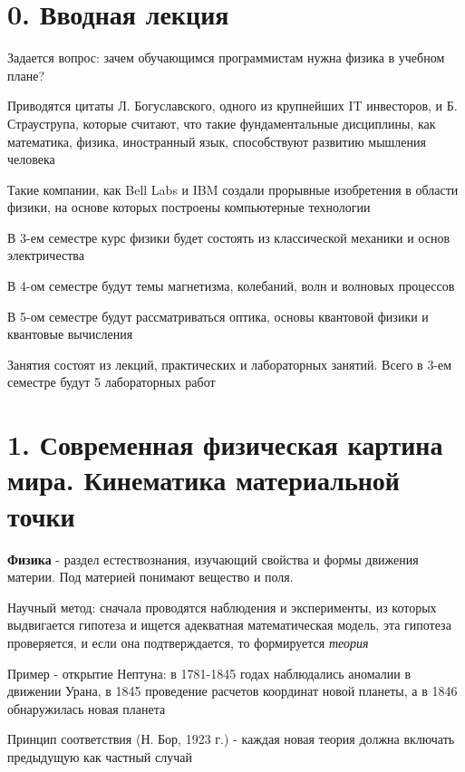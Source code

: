 \documentclass[12pt]{article}
\begin{document}
    \tableofcontents
    \clearpage


    \section{0. Вводная лекция}

    Задается вопрос: зачем обучающимся программистам нужна физика в учебном плане?

    Приводятся цитаты Л. Богуславского, одного из крупнейших IT инвесторов, и Б. Страуструпа, которые считают,
    что такие фундаментальные дисциплины, как математика, физика, иностранный язык, способствуют развитию
    мышления человека

    Такие компании, как Bell Labs и IBM создали прорывные изобретения в области физики, на основе которых
    построены компьютерные технологии

    В 3-ем семестре курс физики будет состоять из классической механики и основ электричества

    В 4-ом семестре будут темы магнетизма, колебаний, волн и волновых процессов

    В 5-ом семестре будут рассматриваться оптика, основы квантовой физики и квантовые вычисления

    Занятия состоят из лекций, практических и лабораторных занятий.
    Всего в 3-ем семестре будут 5 лабораторных работ


    \section{1. Современная физическая картина мира. Кинематика материальной точки}

    \textbf{Физика} - раздел естествознания, изучающий свойства и формы движения материи.
    Под материей понимают вещество и поля.

    Научный метод: сначала проводятся наблюдения и эксперименты, из которых выдвигается гипотеза и ищется
    адекватная математическая модель, эта гипотеза проверяется, и если она подтверждается,
    то формируется \textit{теория}

    Пример - открытие Нептуна: в 1781-1845 годах наблюдались аномалии в движении Урана, в 1845 проведение расчетов
    координат новой планеты, а в 1846 обнаружилась новая планета

    Принцип соответствия (Н. Бор, 1923 г.) - каждая новая теория должна включать предыдущую как частный случай
\end{document}
